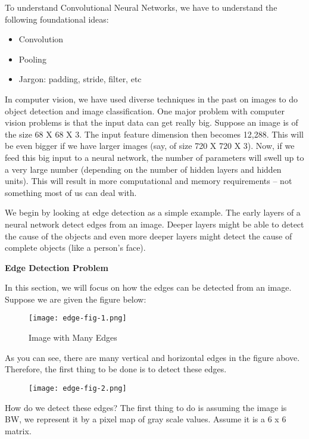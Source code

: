 \doublespacing
\setlength{\parindent}{1cm}

To understand Convolutional Neural Networks, we have to understand the following foundational ideas:

\begin{itemize}
  \item Convolution
  \item Pooling
  \item Jargon: padding, stride, filter, etc
\end{itemize}

In computer vision, we have used diverse techniques in the past on images to do object detection and image classification. One major problem with computer vision problems is that the input data can get really big. Suppose an image is of the size 68 X 68 X 3. The input feature dimension then becomes 12,288. This will be even bigger if we have larger images (say, of size 720 X 720 X 3). Now, if we feed this big input to a neural network, the number of parameters will swell up to a very large number (depending on the number of hidden layers and hidden units). This will result in more computational and memory requirements – not something most of us can deal with. \par

We begin by looking at edge detection as a simple example. The early layers of a neural network detect edges from an image. Deeper layers might be able to detect the cause of the objects and even more deeper layers might detect the cause of complete objects (like a person’s face). \par

\textbf{Edge Detection Problem}

In this section, we will focus on how the edges can be detected from an image. Suppose we are given the figure below:

\begin{figure}
  \caption{Image with Many Edges}
  \texttt{[image: edge-fig-1.png]}
\end{figure}

As you can see, there are many vertical and horizontal edges in the figure above. Therefore, the first thing to be done is to detect these edges.

\begin{figure}
  \texttt{[image: edge-fig-2.png]}
\end{figure}

How do we detect these edges? The first thing to do is assuming the image is BW, we represent it by a pixel map of gray scale values. Assume it is a 6 x 6 matrix.


